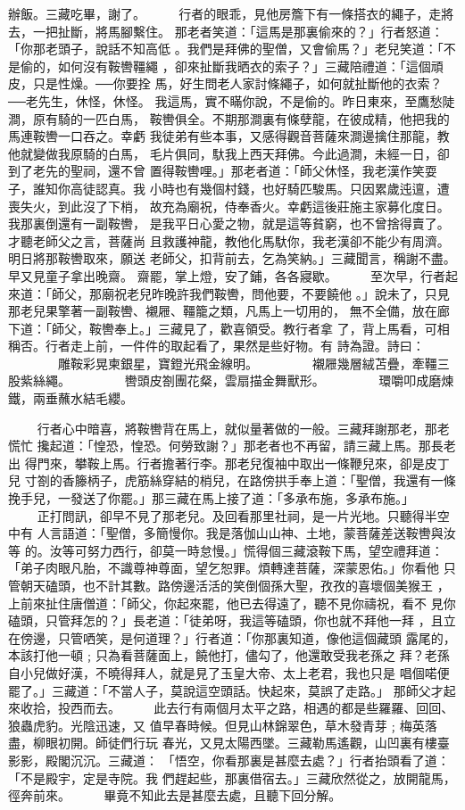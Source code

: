 \begin{pinyinscope}
{辦飯。三藏吃畢，謝了。
　　
行者的眼乖，見他房簷下有一條搭衣的繩子，走將去，一把扯斷，將馬腳繫住。
那老者笑道：「這馬是那裏偷來的？」行者怒道：「你那老頭子，說話不知高低
。我們是拜佛的聖僧，又會偷馬？」老兒笑道：「不是偷的，如何沒有鞍轡韁繩
，卻來扯斷我晒衣的索子？」三藏陪禮道：「這個頑皮，只是性燥。──你要拴
馬，好生問老人家討條繩子，如何就扯斷他的衣索？──老先生，休怪，休怪。
我這馬，實不瞞你說，不是偷的。昨日東來，至鷹愁陡澗，原有騎的一匹白馬，
鞍轡俱全。不期那澗裏有條孽龍，在彼成精，他把我的馬連鞍轡一口吞之。幸虧
我徒弟有些本事，又感得觀音菩薩來澗邊擒住那龍，教他就變做我原騎的白馬，
毛片俱同，馱我上西天拜佛。今此過澗，未經一日，卻到了老先的聖祠，還不曾
置得鞍轡哩。」那老者道：「師父休怪，我老漢作笑耍子，誰知你高徒認真。我
小時也有幾個村錢，也好騎匹駿馬。只因累歲迍邅，遭喪失火，到此沒了下梢，
故充為廟祝，侍奉香火。幸虧這後莊施主家募化度日。我那裏倒還有一副鞍轡，
是我平日心愛之物，就是這等貧窮，也不曾捨得賣了。才聽老師父之言，菩薩尚
且救護神龍，教他化馬馱你，我老漢卻不能少有周濟。明日將那鞍轡取來，願送
老師父，扣背前去，乞為笑納。」三藏聞言，稱謝不盡。早又見童子拿出晚齋。
齋罷，掌上燈，安了鋪，各各寢歇。
　　
至次早，行者起來道：「師父，那廟祝老兒昨晚許我們鞍轡，問他要，不要饒他
。」說未了，只見那老兒果擎著一副鞍轡、襯屜、韁籠之類，凡馬上一切用的，
無不全備，放在廊下道：「師父，鞍轡奉上。」三藏見了，歡喜領受。教行者拿
了，背上馬看，可相稱否。行者走上前，一件件的取起看了，果然是些好物。有
詩為證。詩曰：
　　　　雕鞍彩晃柬銀星，寶鐙光飛金線明。
　　　　襯屜幾層絨苫疊，牽韁三股紫絲繩。
　　　　轡頭皮劄團花粲，雲扇描金舞獸形。
　　　　環嚼叩成磨煉鐵，兩垂蘸水結毛纓。

　　
行者心中暗喜，將鞍轡背在馬上，就似量著做的一般。三藏拜謝那老，那老慌忙
攙起道：「惶恐，惶恐。何勞致謝？」那老者也不再留，請三藏上馬。那長老出
得門來，攀鞍上馬。行者擔著行李。那老兒復袖中取出一條鞭兒來，卻是皮丁兒
寸劄的香籐柄子，虎筋絲穿結的梢兒，在路傍拱手奉上道：「聖僧，我還有一條
挽手兒，一發送了你罷。」那三藏在馬上接了道：「多承布施，多承布施。」
　　
正打問訊，卻早不見了那老兒。及回看那里社祠，是一片光地。只聽得半空中有
人言語道：「聖僧，多簡慢你。我是落伽山山神、土地，蒙菩薩差送鞍轡與汝等
的。汝等可努力西行，卻莫一時怠慢。」慌得個三藏滾鞍下馬，望空禮拜道：
「弟子肉眼凡胎，不識尊神尊面，望乞恕罪。煩轉達菩薩，深蒙恩佑。」你看他
只管朝天磕頭，也不計其數。路傍邊活活的笑倒個孫大聖，孜孜的喜壞個美猴王
，上前來扯住唐僧道：「師父，你起來罷，他已去得遠了，聽不見你禱祝，看不
見你磕頭，只管拜怎的？」長老道：「徒弟呀，我這等磕頭，你也就不拜他一拜
，且立在傍邊，只管哂笑，是何道理？」行者道：「你那裏知道，像他這個藏頭
露尾的，本該打他一頓﹔只為看菩薩面上，饒他打，儘勾了，他還敢受我老孫之
拜？老孫自小兒做好漢，不曉得拜人，就是見了玉皇大帝、太上老君，我也只是
唱個喏便罷了。」三藏道：「不當人子，莫說這空頭話。快起來，莫誤了走路。」
那師父才起來收拾，投西而去。
　　
此去行有兩個月太平之路，相遇的都是些羅羅、回回、狼蟲虎豹。光陰迅速，又
值早春時候。但見山林錦翠色，草木發青芽﹔梅英落盡，柳眼初開。師徒們行玩
春光，又見太陽西墜。三藏勒馬遙觀，山凹裏有樓臺影影，殿閣沉沉。三藏道：
「悟空，你看那裏是甚麼去處？」行者抬頭看了道：「不是殿宇，定是寺院。我
們趕起些，那裏借宿去。」三藏欣然從之，放開龍馬，徑奔前來。
　　
    畢竟不知此去是甚麼去處，且聽下回分解。





}
\end{pinyinscope}
